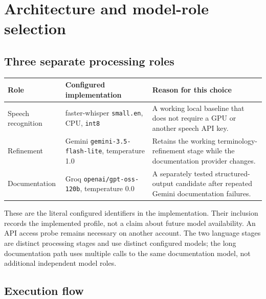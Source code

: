 \documentclass[11pt,a4paper]{article}
\newcommand{\code}[1]{\nolinkurl{#1}}
\begin{document}
\section{Architecture and model-role selection}
\subsection{Three separate processing roles}
\begin{tabularx}{\textwidth}{@{}lYY@{}}\toprule
Role & Configured implementation & Reason for this choice\\\midrule
Speech recognition & faster-whisper \code{small.en}, CPU, \code{int8} & A working local baseline that does not require a GPU or another speech API key.\\
Refinement & Gemini \code{gemini-3.5-flash-lite}, temperature 1.0 & Retains the working terminology-refinement stage while the documentation provider changes.\\
Documentation & Groq \code{openai/gpt-oss-120b}, temperature 0.0 & A separately tested structured-output candidate after repeated Gemini documentation failures.\\\bottomrule
\end{tabularx}

These are the literal configured identifiers in the implementation. Their inclusion records the implemented profile, not a claim about future model availability. An API access probe remains necessary on another account. The two language stages are distinct processing stages and use distinct configured models; the long documentation path uses multiple calls to the same documentation model, not additional independent model roles.

\subsection{Execution flow}
\begin{center}
\end{center}
\end{document}
